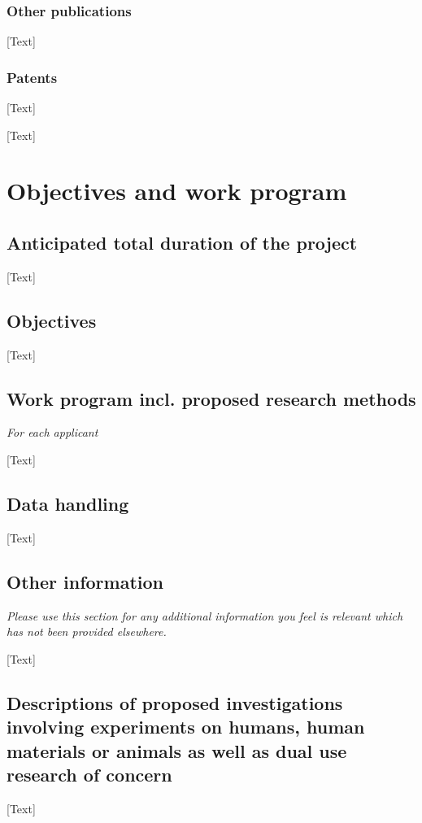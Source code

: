 \documentclass[red]{dfg_proposal_en}
\begin{document}
\subsubsection{Other publications}  %
[Text]

\subsubsection{Patents}  %
[Text]

[Text]


\section{Objectives and work program}  %
\subsection{Anticipated total duration of the project} %
[Text]

\subsection{Objectives}  %
[Text]

\subsection{Work program incl. proposed research methods}  %
\textit{For each applicant}

[Text]

\subsection{Data handling}  %
[Text]

\subsection{Other information}  %
\textit{Please use this section for any additional information you feel is relevant which has not been provided elsewhere.}

[Text]

\subsection{Descriptions of proposed investigations involving experiments on humans, human materials or animals as well as dual use research of concern}  %
[Text]
\end{document}
